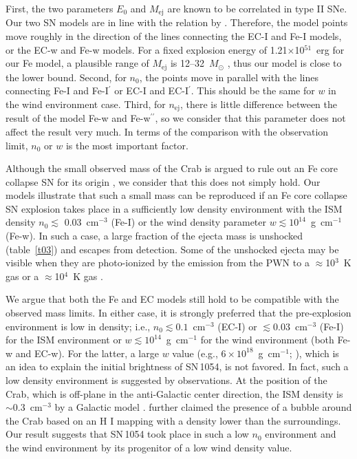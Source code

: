 \documentclass[]{pasj01}
\begin{document}
First, the two parameters $E_{0}$ and $M_{\mathrm{ej}}$ are known to be correlated in
type II SNe. Our two SN models are in line with the relation by
\citet{pejcha15}. Therefore, the model points move roughly in the direction of the lines
connecting the EC-I and Fe-I models, or the EC-w and Fe-w models. For a fixed explosion
energy of 1.21$\times$10$^{51}$~erg for our Fe model, a plausible range of
$M_{\mathrm{ej}}$ is 12--32~$M_{\odot}$ \citep{pejcha15}, thus our model is close to the
lower bound. Second, for $n_{0}$, the points move in parallel with the lines connecting
Fe-I and Fe-I$^{\prime}$ or EC-I and EC-I$^{\prime}$. This should be the same for $w$ in
the wind environment case. Third, for $n_{\mathrm{ej}}$, there is little difference
between the result of the model Fe-w and Fe-w$^{\prime\prime}$, so we consider that this
parameter does not affect the result very much. In terms of the comparison with the
observation limit, $n_{0}$ or $w$ is the most important factor.

Although the small observed mass of the Crab is argued to rule out an Fe core collapse
SN for its origin \citep{seward06}, we consider that this does not simply hold. Our
models illustrate that such a small mass can be reproduced if an Fe core collapse SN
explosion takes place in a sufficiently low density environment with the ISM density
$n_{0} \lesssim$ 0.03~cm$^{-3}$ (Fe-I) or the wind density parameter $w \lesssim
10^{14}$~g~cm$^{-1}$ (Fe-w). In such a case, a large fraction of the ejecta mass is
unshocked (table~\ref{t03}) and escapes from detection. Some of the unshocked ejecta may
be visible when they are photo-ionized by the emission from the PWN to a
$\approx$10$^{3}$~K gas \citep{fesen97} or a $\approx$10$^{4}$~K gas
\citep{sollerman00}.

We argue that both the Fe and EC models still hold to be compatible with the observed
mass limits. In either case, it is strongly preferred that the pre-explosion environment
is low in density; i.e., $n_{0} \lesssim 0.1$~cm$^{-3}$ (EC-I) or $\lesssim
0.03$~cm$^{-3}$ (Fe-I) for the ISM environment or $w \lesssim 10^{14}$~g~cm$^{-1}$ for
the wind environment (both Fe-w and EC-w). For the latter, a large $w$ value (e.g., $6
\times 10^{18}$~g~cm$^{-1}$; \cite{smith13}), which is an idea to explain the initial
brightness of SN\,1054, is not favored. In fact, such a low density environment is
suggested by observations. At the position of the Crab, which is off-plane in the
anti-Galactic center direction, the ISM density is $\sim$0.3~cm$^{-3}$ by a Galactic
model \citep{ferriere98}. \citet{wallace99} further claimed the presence of a bubble
around the Crab based on an H I mapping with a density lower than the surroundings. Our
result suggests that SN\,1054 took place in such a low $n_{0}$ environment and the wind
environment by its progenitor of a low wind density value.
\end{document}
